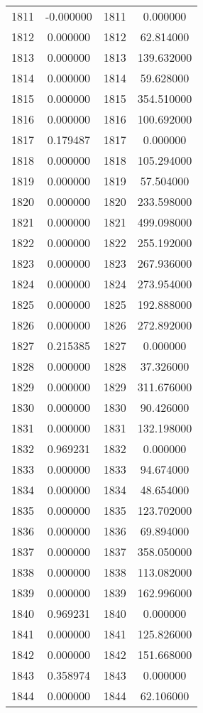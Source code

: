 \documentclass[12pt]{article}
\begin{document}
\begin{longtable}{@{}cccc@{}}
1811 & -0.000000 & 1811 & 0.000000 \\
1812 & 0.000000 & 1812 & 62.814000 \\
1813 & 0.000000 & 1813 & 139.632000 \\
1814 & 0.000000 & 1814 & 59.628000 \\
1815 & 0.000000 & 1815 & 354.510000 \\
1816 & 0.000000 & 1816 & 100.692000 \\
1817 & 0.179487 & 1817 & 0.000000 \\
1818 & 0.000000 & 1818 & 105.294000 \\
1819 & 0.000000 & 1819 & 57.504000 \\
1820 & 0.000000 & 1820 & 233.598000 \\
1821 & 0.000000 & 1821 & 499.098000 \\
1822 & 0.000000 & 1822 & 255.192000 \\
1823 & 0.000000 & 1823 & 267.936000 \\
1824 & 0.000000 & 1824 & 273.954000 \\
1825 & 0.000000 & 1825 & 192.888000 \\
1826 & 0.000000 & 1826 & 272.892000 \\
1827 & 0.215385 & 1827 & 0.000000 \\
1828 & 0.000000 & 1828 & 37.326000 \\
1829 & 0.000000 & 1829 & 311.676000 \\
1830 & 0.000000 & 1830 & 90.426000 \\
1831 & 0.000000 & 1831 & 132.198000 \\
1832 & 0.969231 & 1832 & 0.000000 \\
1833 & 0.000000 & 1833 & 94.674000 \\
1834 & 0.000000 & 1834 & 48.654000 \\
1835 & 0.000000 & 1835 & 123.702000 \\
1836 & 0.000000 & 1836 & 69.894000 \\
1837 & 0.000000 & 1837 & 358.050000 \\
1838 & 0.000000 & 1838 & 113.082000 \\
1839 & 0.000000 & 1839 & 162.996000 \\
1840 & 0.969231 & 1840 & 0.000000 \\
1841 & 0.000000 & 1841 & 125.826000 \\
1842 & 0.000000 & 1842 & 151.668000 \\
1843 & 0.358974 & 1843 & 0.000000 \\
1844 & 0.000000 & 1844 & 62.106000 \\

\end{longtable}
\end{document}
